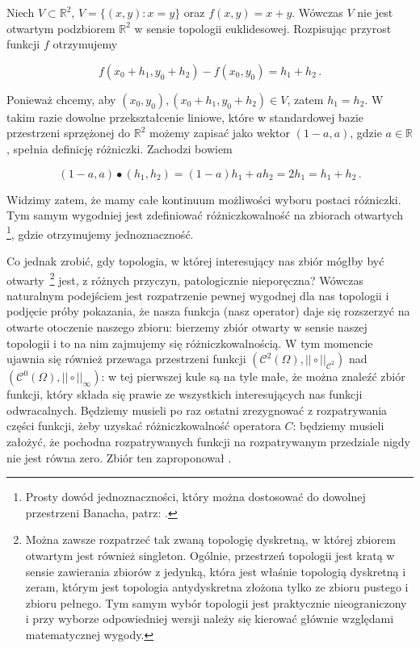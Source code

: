  Niech $ V \subset \mathbb{R}^2 $, $ V = \bigl\{ (x,y) : x = y  \bigl\}$ oraz $ f(x,y) = x+y $. Wówczas $V$ nie jest otwartym podzbiorem $\mathbb{R}^2$ w sensie topologii euklidesowej. Rozpisując przyrost funkcji $f$ otrzymujemy

\begin{equation*}
f(x_0 + h_1, y_0 + h_2) - f(x_0, y_0) = h_1 + h_2 \,.
\end{equation*} 
 

	Ponieważ chcemy, aby $ (x_0, y_0),(x_0 + h_1, y_0 + h_2) \in V $, zatem $ h_1 = h_2 $. W takim razie dowolne przekształcenie liniowe, które w standardowej bazie przestrzeni sprzężonej do $ \mathbb{R}^2 $ możemy zapisać jako wektor $ (1-a, a) $, gdzie $ a \in \mathbb{R} $, spełnia definicję różniczki. Zachodzi bowiem

\begin{equation*}
	(1-a, a) \bullet (h_1, h_2) = (1-a) h_1 + a h_2 = 2 h_1 = h_1 + h_2 \,.
\end{equation*}

	Widzimy zatem, że mamy całe kontinuum możliwości wyboru postaci różniczki. Tym samym wygodniej jest zdefiniować różniczkowalność na zbiorach otwartych \footnote{Prosty dowód jednoznaczności, który można dostosować do dowolnej przestrzeni Banacha, patrz: \citet[][str. 16]{Spivak}.}, gdzie otrzymujemy jednoznaczność. 
	
	Co jednak zrobić, gdy topologia, w której interesujący nas zbiór mógłby być otwarty~\footnote{Można zawsze rozpatrzeć tak zwaną topologię dyskretną, w której zbiorem otwartym jest również singleton. Ogólnie, przestrzeń topologii jest kratą w sensie zawierania zbiorów z jedynką, która jest właśnie topologią dyskretną i zeram, którym jest topologia antydyskretna złożona tylko ze zbioru pustego i zbioru pełnego. Tym samym wybór topologii jest praktycznie nieograniczony i przy wyborze odpowiedniej wersji należy się kierować głównie względami matematycznej wygody.} jest, z różnych przyczyn, patologicznie nieporęczna? Wówczas naturalnym podejściem jest rozpatrzenie pewnej wygodnej dla nas topologii i podjęcie próby pokazania, że nasza funkcja (nasz operator) daje się rozszerzyć na otwarte otoczenie naszego zbioru: bierzemy zbiór otwarty w sensie naszej topologii i to na nim zajmujemy się różniczkowalnością. W tym momencie ujawnia się również przewaga przestrzeni funkcji $(\mathcal{C}^2(\Omega),||\circ||_{\mathcal{C}^2})$ nad $(\mathcal{C}^0(\Omega),||\circ||_{\infty})$: w tej pierwszej kule są na tyle małe, że można znaleźć zbiór funkcji, który składa się prawie ze wszystkich interesujących nas funkcji odwracalnych. Będziemy musieli po raz ostatni zrezygnować z rozpatrywania części funkcji, żeby uzyskać różniczkowalność operatora $C$: będziemy musieli założyć, że pochodna rozpatrywanych funkcji na rozpatrywanym przedziale nigdy nie jest równa zero. Zbiór ten zaproponował \citet{Lanza2}.
		  	 	
